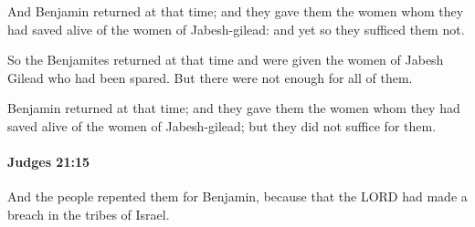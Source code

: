 			\begin{versebox}
					\item[BHS] 
					\item[ASV] And Benjamin returned at that time; and they gave them the women whom they had saved alive of the women of Jabesh-gilead: and yet so they sufficed them not.
					\item[NIV] So the Benjamites returned at that time and were given the women of Jabesh Gilead who had been spared. But there were not enough for all of them.
					\item[NRSV] Benjamin returned at that time; and they gave them the women whom they had saved alive of the women of Jabesh-gilead; but they did not suffice for them.
			\end{versebox}

		\paragraph{Judges 21:15} %
			\label{JUDGES-21-15}

			And the people repented them for Benjamin, because that the LORD had made a breach in the tribes of Israel.

